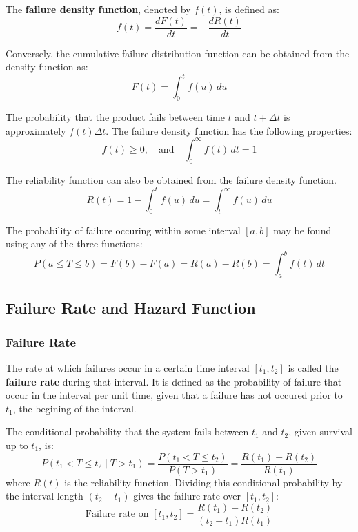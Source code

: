 \documentclass[twoside]{book}
\begin{document}
The \textbf{failure density function}, denoted by $f(t)$, is defined as:
\begin{equation*}
f(t) = \frac{dF(t)}{dt} = -\frac{dR(t)}{dt}
\end{equation*}

Conversely, the cumulative failure distribution function can be obtained from the density function as:
\begin{equation*}
F(t) = \int_0^{t} f(u)\,du
\end{equation*}

The probability that the product fails between time $t$ and $t + \Delta t$ is approximately $f(t)\Delta t$. The failure density function has the following properties:
\begin{equation*}
f(t) \geq 0, \quad \text{and} \quad \int_0^{\infty} f(t)\,dt = 1
\end{equation*}

The reliability function can also be obtained from the failure density function.
$$R(t) = 1 - \int_0^{t} f(u)\,du = \int_t^{\infty} f(u)\,du$$

The probability of failure occuring within some interval $[a,b]$ may be found using any of the three functions:
$$P(a \leq T \leq b) = F(b) - F(a) = R(a) - R(b) =  \int_a^{b} f(t)\,dt$$

\subsection{Failure Rate and Hazard Function}

\subsubsection{Failure Rate}

The rate at which failures occur in a certain time interval $[t_1, t_2]$ is called the \textbf{failure rate} during that interval. It is defined as the probability of failure that occur in the interval per unit time, given that a failure has not occured prior to $t_1$, the begining of the interval.

The conditional probability that the system fails between $t_1$ and $t_2$, given survival up to $t_1$, is:
\[
P(t_1 < T \leq t_2 \mid T > t_1) = \frac{P(t_1 < T \leq t_2)}{P(T > t_1)} = \dfrac{R(t_1) - R(t_2)}{R(t_1)}
\]
where $R(t)$ is the reliability function. Dividing this conditional probability by the interval length $(t_2 - t_1)$ gives the {failure rate} over $[t_1, t_2]$:
\[
\text{Failure rate on } [t_1, t_2] = \dfrac{R(t_1) - R(t_2)}{(t_2 - t_1) R(t_1)}
\]
\end{document}
